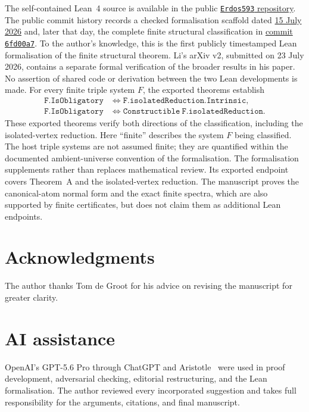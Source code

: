 \documentclass[a4paper,11pt,reqno]{amsart}
\theoremstyle{plain}
\theoremstyle{definition}
\theoremstyle{remark}
\begin{document}
The self-contained Lean~4 source is available in the public
\href{https://github.com/SamPetkov/Erdos593/blob/main/formalization/Erdos593SelfContained.lean}{\texttt{Erdos593} repository}.
The public commit history records a checked formalisation scaffold dated
\href{https://github.com/SamPetkov/Erdos593/commit/ba37b8c511ab390c14a905110366d7cac1ffa08f}{15 July 2026}
and, later that day, the complete finite structural classification in
\href{https://github.com/SamPetkov/Erdos593/commit/6fd00a76064401f3f10aabef474f59d3c6ecd6bf}{commit \texttt{6fd00a7}}.
To the author's knowledge, this is the first publicly timestamped Lean
formalisation of the finite structural theorem.  Li's arXiv v2, submitted on
23 July 2026, contains a separate formal verification of the broader results
in his paper.  No assertion of shared code or derivation between the two Lean
developments is made.
For every finite triple system $F$, the exported theorems establish
\[
\begin{aligned}
\mathtt{F.IsObligatory}
&\Longleftrightarrow \mathtt{F.isolatedReduction.Intrinsic},\\
\mathtt{F.IsObligatory}
&\Longleftrightarrow \mathtt{Constructible\ F.isolatedReduction}.
\end{aligned}
\]
These exported theorems verify both directions of the classification,
including the isolated-vertex reduction.  Here ``finite'' describes the
system $F$ being classified.  The host triple systems are not assumed finite;
they are quantified within the documented ambient-universe convention of the
formalisation.  The formalisation supplements rather than replaces
mathematical review.  Its exported endpoint covers Theorem~A and the
isolated-vertex reduction.  The manuscript proves the canonical-atom normal
form and the exact finite spectra, which are also supported by finite
certificates, but does not claim them as additional Lean endpoints.

\section*{Acknowledgments}

The author thanks Tom de Groot for his advice on revising the manuscript for
greater clarity.

\section*{AI assistance}

OpenAI's GPT-5.6 Pro through ChatGPT and Aristotle~\citep{achim-et-al-2025}
were used in proof development, adversarial checking, editorial
restructuring, and the Lean formalisation.  The author reviewed every
incorporated suggestion and takes full responsibility for the arguments,
citations, and final manuscript.
\end{document}
